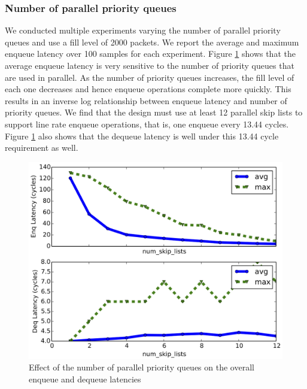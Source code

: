 \subsubsection*{Number of parallel priority queues}
We conducted multiple experiments varying the number of parallel priority queues and use a fill level of 2000 packets. We report the average and maximum enqueue latency over 100 samples for each experiment. Figure \ref{fig:num_skip_lists} shows that the average enqueue latency is very sensitive to the number of priority queues that are used in parallel. As the number of priority queues increases, the fill level of each one decreases and hence enqueue operations complete more quickly. This results in an inverse log relationship between enqueue latency and number of priority queues. We find that the design must use at least 12 parallel skip lists to support line rate enqueue operations, that is, one enqueue every 13.44 cycles. Figure \ref{fig:num_skip_lists} also shows that the dequeue latency is well under this 13.44 cycle requirement as well.

\begin{figure}[!h]
\includegraphics[width=1\linewidth]{figures/eval/enq_deq_v_num_skip_lists}
\caption{Effect of the number of parallel priority queues on the overall enqueue and dequeue latencies}
\label{fig:num_skip_lists}
\end{figure}



